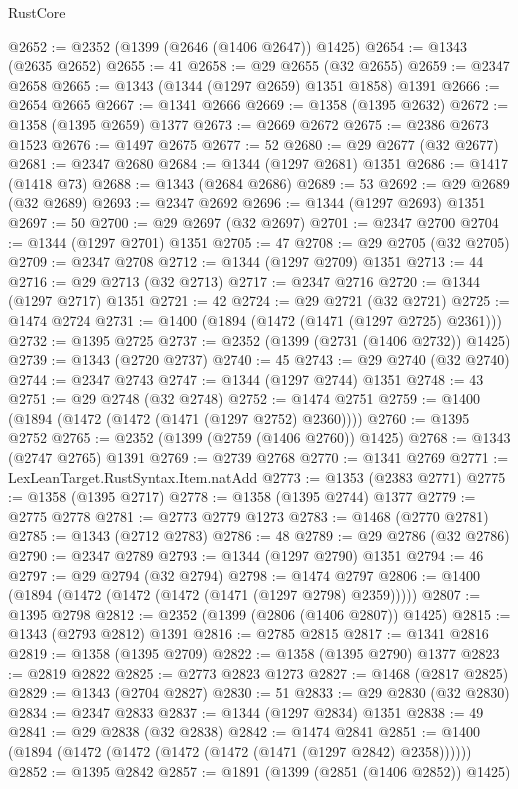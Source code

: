 \begin{lexlean}{RustCore}
\begin{coremodule}
@2652 := @2352 (@1399 (@2646 (@1406 @2647)) @1425)
@2654 := @1343 (@2635 @2652)
@2655 := 41
@2658 := @29 @2655 (@32 @2655)
@2659 := @2347 @2658
@2665 := @1343 (@1344 (@1297 @2659) @1351 @1858) @1391
@2666 := @2654 @2665
@2667 := @1341 @2666
@2669 := @1358 (@1395 @2632)
@2672 := @1358 (@1395 @2659) @1377
@2673 := @2669 @2672
@2675 := @2386 @2673 @1523
@2676 := @1497 @2675
@2677 := 52
@2680 := @29 @2677 (@32 @2677)
@2681 := @2347 @2680
@2684 := @1344 (@1297 @2681) @1351
@2686 := @1417 (@1418 @73)
@2688 := @1343 (@2684 @2686)
@2689 := 53
@2692 := @29 @2689 (@32 @2689)
@2693 := @2347 @2692
@2696 := @1344 (@1297 @2693) @1351
@2697 := 50
@2700 := @29 @2697 (@32 @2697)
@2701 := @2347 @2700
@2704 := @1344 (@1297 @2701) @1351
@2705 := 47
@2708 := @29 @2705 (@32 @2705)
@2709 := @2347 @2708
@2712 := @1344 (@1297 @2709) @1351
@2713 := 44
@2716 := @29 @2713 (@32 @2713)
@2717 := @2347 @2716
@2720 := @1344 (@1297 @2717) @1351
@2721 := 42
@2724 := @29 @2721 (@32 @2721)
@2725 := @1474 @2724
@2731 := @1400 (@1894 (@1472 (@1471 (@1297 @2725) @2361)))
@2732 := @1395 @2725
@2737 := @2352 (@1399 (@2731 (@1406 @2732)) @1425)
@2739 := @1343 (@2720 @2737)
@2740 := 45
@2743 := @29 @2740 (@32 @2740)
@2744 := @2347 @2743
@2747 := @1344 (@1297 @2744) @1351
@2748 := 43
@2751 := @29 @2748 (@32 @2748)
@2752 := @1474 @2751
@2759 := @1400 (@1894 (@1472 (@1472 (@1471 (@1297 @2752) @2360))))
@2760 := @1395 @2752
@2765 := @2352 (@1399 (@2759 (@1406 @2760)) @1425)
@2768 := @1343 (@2747 @2765) @1391
@2769 := @2739 @2768
@2770 := @1341 @2769
@2771 := LexLeanTarget.RustSyntax.Item.natAdd
@2773 := @1353 (@2383 @2771)
@2775 := @1358 (@1395 @2717)
@2778 := @1358 (@1395 @2744) @1377
@2779 := @2775 @2778
@2781 := @2773 @2779 @1273
@2783 := @1468 (@2770 @2781)
@2785 := @1343 (@2712 @2783)
@2786 := 48
@2789 := @29 @2786 (@32 @2786)
@2790 := @2347 @2789
@2793 := @1344 (@1297 @2790) @1351
@2794 := 46
@2797 := @29 @2794 (@32 @2794)
@2798 := @1474 @2797
@2806 := @1400 (@1894 (@1472 (@1472 (@1472 (@1471 (@1297 @2798) @2359)))))
@2807 := @1395 @2798
@2812 := @2352 (@1399 (@2806 (@1406 @2807)) @1425)
@2815 := @1343 (@2793 @2812) @1391
@2816 := @2785 @2815
@2817 := @1341 @2816
@2819 := @1358 (@1395 @2709)
@2822 := @1358 (@1395 @2790) @1377
@2823 := @2819 @2822
@2825 := @2773 @2823 @1273
@2827 := @1468 (@2817 @2825)
@2829 := @1343 (@2704 @2827)
@2830 := 51
@2833 := @29 @2830 (@32 @2830)
@2834 := @2347 @2833
@2837 := @1344 (@1297 @2834) @1351
@2838 := 49
@2841 := @29 @2838 (@32 @2838)
@2842 := @1474 @2841
@2851 := @1400 (@1894 (@1472 (@1472 (@1472 (@1472 (@1471 (@1297 @2842) @2358))))))
@2852 := @1395 @2842
@2857 := @1891 (@1399 (@2851 (@1406 @2852)) @1425)

\end{coremodule}
\end{lexlean}
